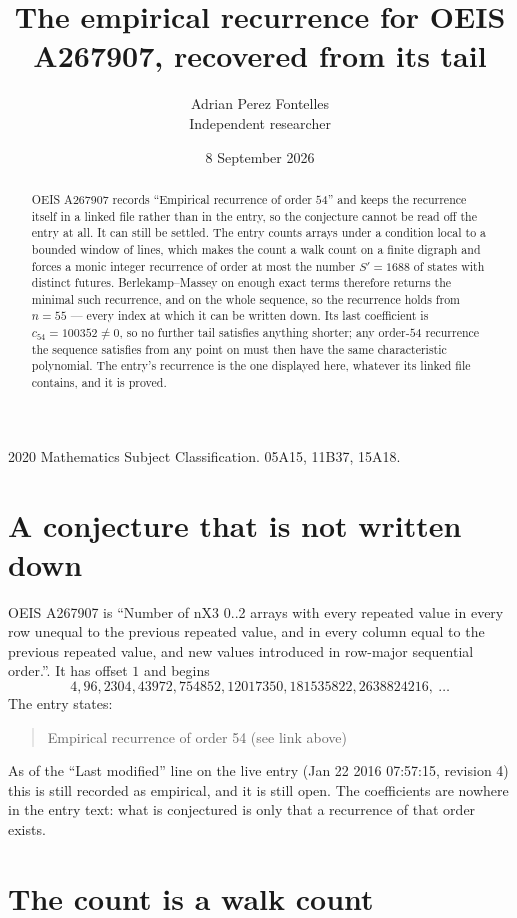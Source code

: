 \documentclass[11pt,a4paper]{article}
\title{The empirical recurrence for OEIS A267907, recovered from its tail}
\author{Adrian Perez Fontelles\\ \small Independent researcher}
\date{8 September 2026}
\theoremstyle{plain}
\theoremstyle{definition}
\begin{document}
\maketitle

\begin{abstract}
OEIS A267907 records ``Empirical recurrence of order $54$'' and keeps the recurrence itself in
a linked file rather than in the entry, so the conjecture cannot be read off the entry at all.
It can still be settled. The entry counts arrays under a condition local to a bounded window of
lines, which makes the count a walk count on a finite digraph and forces a monic integer
recurrence of order at most the number $S'=1688$ of states with distinct futures. Berlekamp--Massey on
enough exact terms therefore returns the minimal such recurrence, and on the whole sequence, so the recurrence holds from $n=55$ --- every index at which it can be written down.
Its last coefficient is $c_{54}=100352\neq0$, so no further tail satisfies anything
shorter; any order-$54$ recurrence the sequence satisfies from any point on must then have
the same characteristic polynomial. The entry's recurrence is the one displayed here, whatever
its linked file contains, and it is proved.
\end{abstract}

\noindent\small 2020 Mathematics Subject Classification. 05A15, 11B37, 15A18.\normalsize

\section{A conjecture that is not written down}

OEIS A267907 is ``Number of nX3 0..2 arrays with every repeated value in every row unequal to the previous repeated value, and in every column equal to the previous repeated value, and new values introduced in row-major sequential order.''. It has offset $1$ and begins
\[
4, 96, 2304, 43972, 754852, 12017350, 181535822, 2638824216,\ \dots
\]
The entry states:
\begin{quote}
Empirical recurrence of order 54 (see link above)
\end{quote}
As of the ``Last modified'' line on the live entry (Jan 22 2016 07:57:15, revision 4)
this is still recorded as empirical, and it is still open. The coefficients are nowhere in the
entry text: what is conjectured is only that a recurrence of that order exists.

\section{The count is a walk count}
\end{document}
